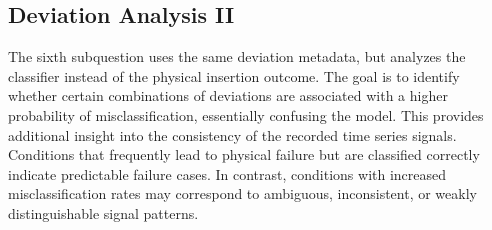 \subsection{Deviation Analysis II}
The sixth subquestion uses the same deviation metadata, but analyzes the classifier instead of the physical insertion outcome. The goal is to identify whether certain combinations of deviations are associated with a higher probability of misclassification, essentially confusing the model. This provides additional insight into the consistency of the recorded time series signals. Conditions that frequently lead to physical failure but are classified correctly indicate predictable failure cases. In contrast, conditions with increased misclassification rates may correspond to ambiguous, inconsistent, or weakly distinguishable signal patterns.
